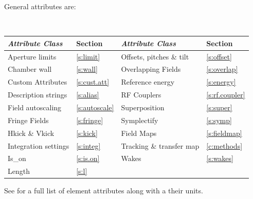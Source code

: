 General  attributes are:
\begin{center}
\tt
\begin{tabular}{llll} \toprule
  {\sl Attribute Class}      & Section           & {\sl Attribute Class}      & Section            \\ \midrule
  Aperture limits            & \ref{s:limit}     & Offsets, pitches \& tilt   & \ref{s:offset}     \\
  Chamber wall               & \ref{s:wall}      & Overlapping Fields         & \ref{s:overlap}    \\
  Custom Attributes          & \ref{s:cust.att}  & Reference energy           & \ref{s:energy}     \\ 
  Description strings        & \ref{s:alias}     & RF Couplers                & \ref{s:rf.coupler} \\
  Field autoscaling          & \ref{s:autoscale} & Superposition              & \ref{s:super}      \\
  Fringe Fields              & \ref{s:fringe}    & Symplectify                & \ref{s:symp}       \\
  Hkick \& Vkick             & \ref{s:kick}      & Field Maps                 & \ref{s:fieldmap}   \\
  Integration settings       & \ref{s:integ}     & Tracking \& transfer map   & \ref{c:methods}    \\
  Is_on                      & \ref{s:is.on}     & Wakes                      & \ref{s:wakes}      \\
  Length                     & \ref{s:l}         &                            &                    \\
  \bottomrule
\end{tabular}
\end{center}
\toffset
See  for a full list of element attributes along with a their units.

